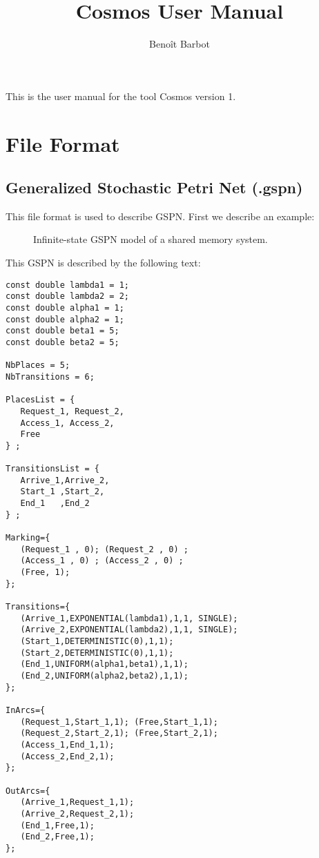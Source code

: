 \documentclass{article}
\title{Cosmos User Manual}
\author{Beno\^it Barbot}
\begin{document}
\maketitle


This is the user manual for the tool Cosmos version 1.

\section{File Format}
\subsection{Generalized Stochastic Petri Net (.gspn)}
This file format is used to describe GSPN.
First we describe an example:\\
\begin{figure}[h]
  \centering
  
  \caption{Infinite-state GSPN  model of a shared memory system.}
  \label{fig:sharedmem}
\end{figure}
This GSPN is described by the following text:
\begin{verbatim}
const double lambda1 = 1;
const double lambda2 = 2;
const double alpha1 = 1;
const double alpha2 = 1;
const double beta1 = 5;
const double beta2 = 5;

NbPlaces = 5;
NbTransitions = 6;

PlacesList = { 
   Request_1, Request_2,
   Access_1, Access_2,
   Free
} ;

TransitionsList = { 
   Arrive_1,Arrive_2,
   Start_1 ,Start_2,
   End_1   ,End_2
} ;

Marking={
   (Request_1 , 0); (Request_2 , 0) ; 
   (Access_1 , 0) ; (Access_2 , 0) ;
   (Free, 1);
};

Transitions={
   (Arrive_1,EXPONENTIAL(lambda1),1,1, SINGLE); 
   (Arrive_2,EXPONENTIAL(lambda2),1,1, SINGLE);
   (Start_1,DETERMINISTIC(0),1,1); 
   (Start_2,DETERMINISTIC(0),1,1);
   (End_1,UNIFORM(alpha1,beta1),1,1); 
   (End_2,UNIFORM(alpha2,beta2),1,1);
};

InArcs={
   (Request_1,Start_1,1); (Free,Start_1,1);
   (Request_2,Start_2,1); (Free,Start_2,1);
   (Access_1,End_1,1);
   (Access_2,End_2,1);
};

OutArcs={
   (Arrive_1,Request_1,1); 
   (Arrive_2,Request_2,1);
   (End_1,Free,1);
   (End_2,Free,1);
};
\end{verbatim}
\end{document}
